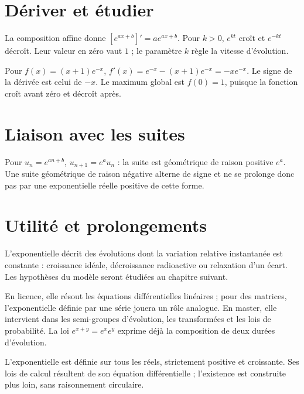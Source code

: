\documentclass[../cours_1re.tex]{subfiles}
\begin{document}
\begin{finchapitre}
\section{Dériver et étudier}
La composition affine donne $[e^{ax+b}]'=ae^{ax+b}$. Pour $k>0$, $e^{kt}$ croît et $e^{-kt}$ décroît.
Leur valeur en zéro vaut $1$ ; le paramètre $k$ règle la vitesse d'évolution.
\begin{exemple}
Pour $f(x)=(x+1)e^{-x}$, $f'(x)=e^{-x}-(x+1)e^{-x}=-xe^{-x}$. Le signe de la dérivée est celui de $-x$. Le maximum global est $f(0)=1$, puisque la fonction croît avant zéro et décroît après.
\end{exemple}
\section{Liaison avec les suites}
Pour $u_n=e^{an+b}$, $u_{n+1}=e^a u_n$ : la suite est géométrique de raison positive $e^a$.
Une suite géométrique de raison négative alterne de signe et ne se prolonge donc pas par une exponentielle réelle positive de cette forme.


\section{Utilité et prolongements}
L'exponentielle décrit des évolutions dont la variation relative instantanée est constante : croissance idéale, décroissance radioactive ou relaxation d'un écart. Les hypothèses du modèle seront étudiées au chapitre suivant.

En licence, elle résout les équations différentielles linéaires ; pour des matrices, l'exponentielle définie par une série jouera un rôle analogue. En master, elle intervient dans les semi-groupes d'évolution, les transformées et les lois de probabilité. La loi $e^{x+y}=e^xe^y$ exprime déjà la composition de deux durées d'évolution.
\begin{retenir}
L'exponentielle est définie sur tous les réels, strictement positive et croissante. Ses lois de calcul résultent de son équation différentielle ; l'existence est construite plus loin, sans raisonnement circulaire.
\end{retenir}
\end{finchapitre}
\end{document}
